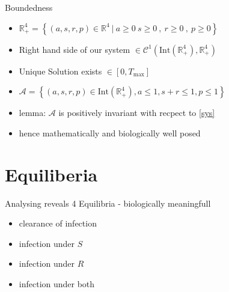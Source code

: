 \documentclass{beamer}
\begin{document}
\begin{frame}{Boundedness}
  \begin{itemize}
    \item \( \mathbb{R}^4_+ = \left\{ (a,s,r,p) \in \mathbb{R}^4 \ | \ a \ge 0 \ s \ge 0 \ , \ r \ge 0 \ , \ p \ge 0  \right\} \)
    \item Right hand side of our system \( \in \mathcal{C}^1 \left(\text{Int}(\mathbb{R}^4_+), \mathbb{R}^4_+\right) \)
    \item Unique Solution exists $\in [0, T_{\max}]$
    \item \(\mathcal{A} = \left\{ (a,s,r,p) \in \text{Int}\left(\mathbb{R}^4_+\right) , a \le 1 , s+r \le 1 , p \le 1 \right\} \) 
    \item lemma: \(\mathcal{A}\) is positively invariant with recpect to \ref{sys} 
    \item hence mathematically and biologically well posed 
  \end{itemize}

\end{frame}

\section{Equiliberia}
\begin{frame}
  Analysing reveals 4 Equilibria - biologically meaningfull
  \begin{itemize}
    \item clearance of infection
    \item infection under $S$
    \item infection under $R$
    \item infection under both
  \end{itemize}
\end{frame}
\end{document}
